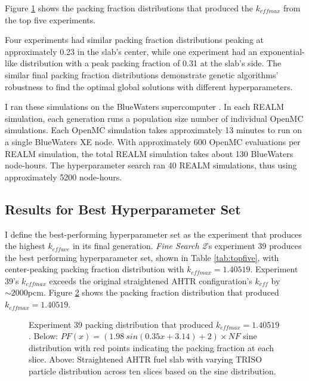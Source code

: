 Figure \ref{fig:topfiveplot} shows the packing fraction distributions that 
produced the $k_{eff max}$ from the top five experiments. 
\begin{figure}[]
    \centering
    \caption{}
    \label{fig:topfiveplot}
\end{figure}
Four experiments had similar packing fraction distributions peaking at approximately 
0.23 in the slab's center, while one experiment had an exponential-like 
distribution with a peak packing fraction of 0.31 at the slab's side.
The similar final packing fraction distributions demonstrate genetic algorithms' 
robustness to find the optimal global solutions with different hyperparameters. 

I ran these simulations on the BlueWaters supercomputer \cite{ncsa_about_2017}. 
In each \gls{REALM} simulation, each generation runs a population size number 
of individual OpenMC simulations. 
Each OpenMC simulation takes approximately 13 minutes to run on a single BlueWaters 
XE node. 
With approximately 600 OpenMC evaluations per \gls{REALM} simulation, the total 
\gls{REALM} simulation takes about 130 BlueWaters node-hours. 
The hyperparameter search ran 40 \gls{REALM} simulations, thus using approximately
5200 node-hours.

\subsection{Results for Best Hyperparameter Set}
\label{sec:best}
I define the best-performing hyperparameter set as the experiment that produces 
the highest $k_{eff ave}$ in its final generation. 
\textit{Fine Search 2}'s experiment 39 produces the best performing 
hyperparameter set, shown in Table \ref{tab:topfive}, with 
center-peaking packing fraction distribution with $k_{eff max} = 1.40519$. 
Experiment 39's $k_{eff max}$ exceeds the original straightened \gls{AHTR} 
configuration's $k_{eff}$ by $\sim2000$pcm. 
Figure \ref{fig:triso_distribution_sine_39} shows the packing fraction distribution 
that produced $k_{eff max} = 1.40519$. 
\begin{figure}[]
    \centering
    \caption{Experiment 39 packing distribution that produced $k_{eff max} = 1.40519$. 
    Below: $PF(x) = (1.98\ sin(0.35x+3.14)+2)  \times NF$ sine distribution with 
    red points indicating the packing fraction at each slice. 
    Above: Straightened \acrfull{AHTR} fuel slab with varying \gls{TRISO} particle 
    distribution across ten slices based on the sine distribution. }
    \label{fig:triso_distribution_sine_39}
\end{figure}

